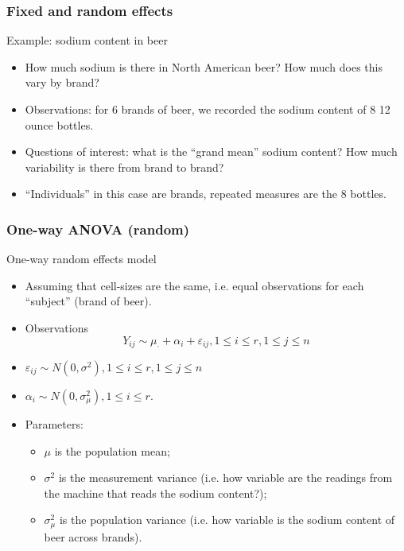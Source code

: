 \documentclass[handout]{beamer}
\begin{document}
   \begin{frame} \frametitle{Fixed and random effects}

   \begin{block}
   {Example: sodium content in beer}

   \begin{itemize}[<+->]

   \item How much sodium is there in North American beer? How much does this vary by brand?

   \item Observations: for 6 brands of beer, we recorded the sodium content of 8 12 ounce bottles.

   \item Questions of interest: what is the ``grand mean'' sodium content? How much variability is there from brand to brand?

   \item ``Individuals'' in this case are brands, repeated measures are the 8 bottles.
   \end{itemize}
   \end{block}
   \end{frame}


   \begin{frame} \frametitle{One-way ANOVA (random)}

   \begin{block}
   {One-way random effects model}

   \begin{itemize}

   \item Assuming that cell-sizes are the same, i.e. equal observations for each ``subject'' (brand of beer).
   \item Observations       $$
   Y_{ij} \sim \mu_{\cdot} + \alpha_i + \varepsilon_{ij}, 1 \leq i \leq r, 1 \leq j \leq n$$

   \item $\varepsilon_{ij} \sim N(0, \sigma^2), 1 \leq i \leq r, 1 \leq j \leq n$
   \item $\alpha_i \sim N(0, \sigma^2_{\mu}), 1 \leq  i \leq r.$

   \item Parameters:
   \begin{itemize}
   \item $\mu$ is the population mean;

   \item $\sigma^2$ is the measurement variance (i.e. how variable are the readings from the machine that reads the sodium content?);
   \item $\sigma^2_{\mu}$ is the population variance (i.e. how variable is the  sodium content of beer across brands).
   \end{itemize}
   \end{itemize}
   \end{block}
   \end{frame}
\end{document}

